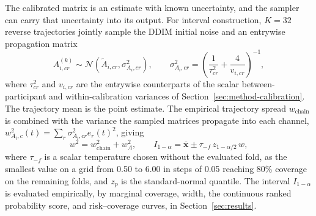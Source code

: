 The calibrated matrix is an estimate with known uncertainty, and the sampler can carry that uncertainty into its output. For interval construction, $K=32$ reverse trajectories jointly sample the DDIM initial noise and an entrywise propagation matrix
\begin{equation}
  A^{(k)}_{i,cr}\sim
  \mathcal{N}\!\left(\widetilde A_{i,cr},\sigma^2_{A_i,cr}\right),
  \qquad
  \sigma^2_{A_i,cr}=\left(\frac{1}{\tau^2_{cr}}+\frac{4}{v_{i,cr}}\right)^{-1},
  \label{eq:operator-sample}
\end{equation}
where $\tau^2_{cr}$ and $v_{i,cr}$ are the entrywise counterparts of the scalar between-participant and within-calibration variances of Section~\ref{sec:method-calibration}. The trajectory mean is the point estimate. The empirical trajectory spread $w_{\mathrm{chain}}$ is combined with the variance the sampled matrices propagate into each channel, $w^2_{A_i,c}(t)=\sum_{r}\sigma^2_{A_i,cr}e_r(t)^2$, giving
\begin{equation}
  w^2=w_{\mathrm{chain}}^2+w_A^2,
  \qquad
  I_{1-\alpha}=\overline{\mathbf{x}}
  \mathbin{\pm} \tau_{-f}\,z_{1-\alpha/2}\,w,
  \label{eq:interval}
\end{equation}
where $\tau_{-f}$ is a scalar temperature chosen without the evaluated fold, as the smallest value on a grid from 0.50 to 6.00 in steps of 0.05 reaching 80\% coverage on the remaining folds, and $z_p$ is the standard-normal quantile. The interval $I_{1-\alpha}$ is evaluated empirically, by marginal coverage, width, the continuous ranked probability score, and risk--coverage curves, in Section~\ref{sec:results}.
